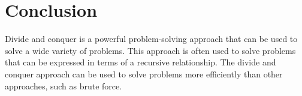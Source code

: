 \documentclass[10pt]{article}
\begin{document}
\section{Conclusion}

Divide and conquer is a powerful problem-solving approach that can be used to solve a wide variety of problems. This approach is often used to solve problems that can be expressed in terms of a recursive relationship. The divide and conquer approach can be used to solve problems more efficiently than other approaches, such as brute force.
\end{document}
